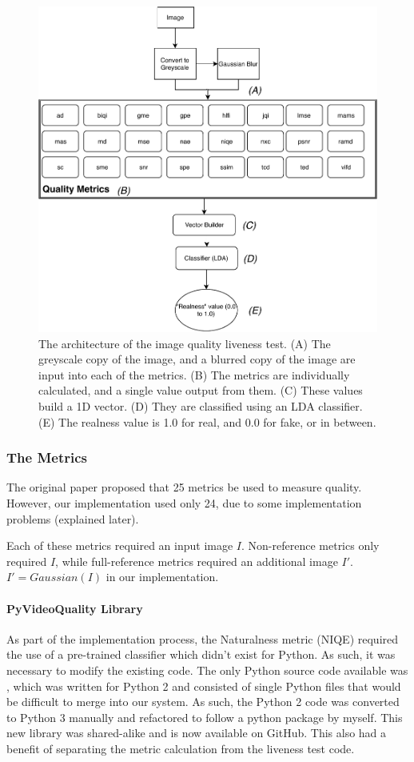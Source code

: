 \documentclass[10pt,a4paper]{article}
\begin{document}
            \begin{figure}
                \centering
                \includegraphics[width=.5\linewidth]{ImageQualityLivenessTest.pdf}
                \caption{The architecture of the image quality liveness test. (A) The greyscale copy of the image, and a blurred copy of the image are input into each of the metrics.
                (B) The metrics are individually calculated, and a single value output from them. (C) These values build a 1D vector. (D) They are classified using an LDA classifier. (E) The realness value
                is 1.0 for real, and 0.0 for fake, or in between.}
                \label{ImageQualityLivenessTestDiagram}
            \end{figure}
    
            \subsubsection{The Metrics}
            The original paper proposed that 25 metrics be used to measure quality. However, our implementation used only 24, due to some implementation problems (explained later).

            Each of these metrics required an input image $I$. Non-reference metrics only required $I$, while full-reference metrics required an additional image $I'$. $I' = Gaussian(I)$ in our implementation.
            
            \paragraph{PyVideoQuality Library}
            As part of the implementation process, the Naturalness metric (NIQE) required the use of a pre-trained classifier which didn't exist for Python. As such, it was necessary to modify the existing code.
            The only Python source code available was \cite{VideoQualityOriginal}, which was written for Python 2 and consisted of single Python files that would be difficult to merge into our system.
            As such, the Python 2 code was converted to Python 3 manually and refactored to follow a python package by myself. This new library was shared-alike and is now available on GitHub. \cite{VideoQualityUpdated} This also had a benefit of separating the metric calculation from the liveness test code.
            
\end{document}
